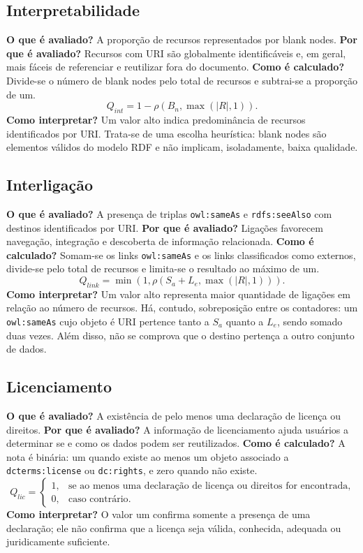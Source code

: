 \documentclass[12pt,a4paper]{article}
\newcommand{\card}[1]{\left\lvert #1\right\rvert}
\begin{document}
\subsection{Interpretabilidade}
\noindent\textbf{O que é avaliado?} A proporção de recursos representados por blank nodes. \textbf{Por que é avaliado?} Recursos com URI são globalmente identificáveis e, em geral, mais fáceis de referenciar e reutilizar fora do documento. \textbf{Como é calculado?} Divide-se o número de blank nodes pelo total de recursos e subtrai-se a proporção de um.
\[
Q_{int}=1-\rho(B_n,\max(\card{R},1)).
\]
\noindent\textbf{Como interpretar?} Um valor alto indica predominância de recursos identificados por URI. Trata-se de uma escolha heurística: blank nodes são elementos válidos do modelo RDF e não implicam, isoladamente, baixa qualidade.
\subsection{Interligação}
\noindent\textbf{O que é avaliado?} A presença de triplas \texttt{owl:sameAs} e \texttt{rdfs:seeAlso} com destinos identificados por URI. \textbf{Por que é avaliado?} Ligações favorecem navegação, integração e descoberta de informação relacionada. \textbf{Como é calculado?} Somam-se os links \texttt{owl:sameAs} e os links classificados como externos, divide-se pelo total de recursos e limita-se o resultado ao máximo de um.
\[
Q_{link}=\min\left(1,\rho(S_a+L_e,\max(\card{R},1))\right).
\]
\noindent\textbf{Como interpretar?} Um valor alto representa maior quantidade de ligações em relação ao número de recursos. Há, contudo, sobreposição entre os contadores: um \texttt{owl:sameAs} cujo objeto é URI pertence tanto a \(S_a\) quanto a \(L_e\), sendo somado duas vezes. Além disso, não se comprova que o destino pertença a outro conjunto de dados.
\subsection{Licenciamento}
\noindent\textbf{O que é avaliado?} A existência de pelo menos uma declaração de licença ou direitos. \textbf{Por que é avaliado?} A informação de licenciamento ajuda usuários a determinar se e como os dados podem ser reutilizados. \textbf{Como é calculado?} A nota é binária: um quando existe ao menos um objeto associado a \texttt{dcterms:license} ou \texttt{dc:rights}, e zero quando não existe.
\[
Q_{lic}= \begin{cases} 1, & \text{se ao menos uma declaração de licença ou direitos for encontrada},\\ 0, & \text{caso contrário}. \end{cases}
\]
\noindent\textbf{Como interpretar?} O valor um confirma somente a presença de uma declaração; ele não confirma que a licença seja válida, conhecida, adequada ou juridicamente suficiente.
\end{document}
